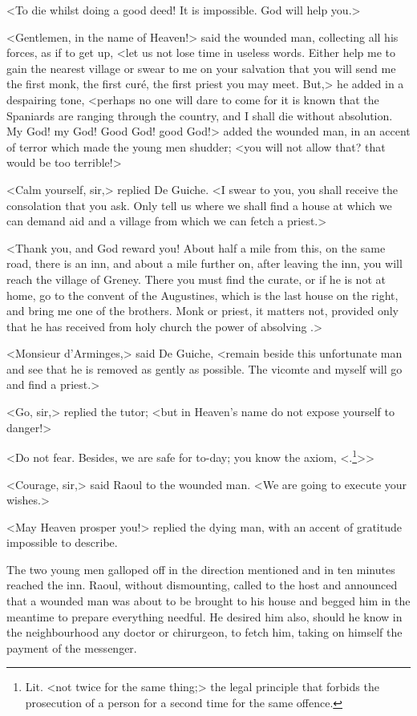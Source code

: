 <To die whilst doing a good deed! It is impossible. God will help you.>

<Gentlemen, in the name of Heaven!> said the wounded man, collecting all his forces, as if to get up, <let us not lose time in useless words. Either help me to gain the nearest village or swear to me on your salvation that you will send me the first monk, the first curé, the first priest you may meet. But,> he added in a despairing tone, <perhaps no one will dare to come for it is known that the Spaniards are ranging through the country, and I shall die without absolution. My God! my God! Good God! good God!> added the wounded man, in an accent of terror which made the young men shudder; <you will not allow that? that would be too terrible!>

<Calm yourself, sir,> replied De Guiche. <I swear to you, you shall receive the consolation that you ask. Only tell us where we shall find a house at which we can demand aid and a village from which we can fetch a priest.>

<Thank you, and God reward you! About half a mile from this, on the same road, there is an inn, and about a mile further on, after leaving the inn, you will reach the village of Greney. There you must find the curate, or if he is not at home, go to the convent of the Augustines, which is the last house on the right, and bring me one of the brothers. Monk or priest, it matters not, provided only that he has received from holy church the power of absolving .>

<Monsieur d'Arminges,> said De Guiche, <remain beside this unfortunate man and see that he is removed as gently as possible. The vicomte and myself will go and find a priest.>

<Go, sir,> replied the tutor; <but in Heaven's name do not expose yourself to danger!>

<Do not fear. Besides, we are safe for to-day; you know the axiom, <.\footnote{Lit. <not twice for the same thing;> the legal principle that forbids the prosecution of a person for a second time for the same offence.}>>

<Courage, sir,> said Raoul to the wounded man. <We are going to execute your wishes.>

<May Heaven prosper you!> replied the dying man, with an accent of gratitude impossible to describe.

The two young men galloped off in the direction mentioned and in ten minutes reached the inn. Raoul, without dismounting, called to the host and announced that a wounded man was about to be brought to his house and begged him in the meantime to prepare everything needful. He desired him also, should he know in the neighbourhood any doctor or chirurgeon, to fetch him, taking on himself the payment of the messenger.

